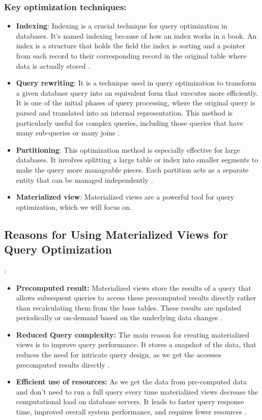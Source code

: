 \subsubsection{Key optimization techniques:}
 \begin{itemize}
     \item \textbf{Indexing}: Indexing is a crucial technique for query optimization in databases. It's named indexing because of how an index works in a book. An index is a structure that holds the field the index is sorting and a pointer from each record to their corresponding record in the original table where data is actually stored \cite{tomar-2021,atlassian-no-date}.
     \item \textbf{Query rewriting}: It is a technique used in query optimization to transform a given database query into an equivalent form that executes more efficiently. It is one of the initial phases of query processing, where the original query is parsed and translated into an internal representation. This method is particularly useful for complex queries, including those queries that have many sub-queries or many joins \cite{pitoura-2009,unknown-IBM-25-2024}.
     \item \textbf{Partitioning}: This optimization method is especially effective for large databases. It involves splitting a large table or index into smaller segments to make the query more manageable pieces. Each partition acts as a separate entity that can be managed independently \cite{planck-2024}.
     \item \textbf{Materialized view}: Materialized views are a powerful tool for query optimization, which we will focus on. 
 \end{itemize}
 
 \subsection{Reasons for Using Materialized Views for Query Optimization}:
\begin{itemize}
    \item\textbf{Precomputed result:} Materialized views store the results of a query that allows subsequent queries to access these precomputed results directly rather than recalculating them from the base tables. These results are updated periodically or on-demand based on the underlying data changes \cite{khan-2023,Risingwave-no-date}.
    \item\textbf{Reduced Query complexity:} The main reason for creating materialized views is to improve query performance. It stores a snapshot of the data, that reduces the need for intricate query design, as we get the accesses precomputed results directly \cite{Risingwave-no-date,Databricks-no-date}.
    \item\textbf{Efficient use of resources:} As we get the data from pre-computed data and don't need to run a full query every time materialized views decrease the computational load on database servers. It leads to faster query response time, improved overall system performance, and requires fewer resources \cite{google-no-date, khan-2023}.
    
\end{itemize}\vspace{.4cm}

